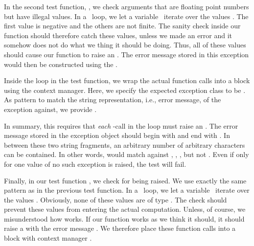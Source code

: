 In the second test function, , we check arguments that are floating point numbers but have illegal values.
In a ~loop, we let a variable~ iterate over the values .
The first value is negative and the others are not finite.
The sanity check  inside our function should therefore catch these values, unless we made an error and it somehow does not do what we thing it should be doing.
Thus, all of these values should cause our  function to raise an .
The error message stored in this exception would then be constructed using the  .

Inside the loop in the test function, we wrap the actual function calls into a  block using the  context manager.
Here, we specify the expected exception class to be .
As pattern to match the string representation, i.e., error message, of the exception against, we provide .
%
\begin{sloppypar}%
In summary, this requires that \emph{each} -call in the loop must raise an .
The error message stored in the exception object should begin with  and end with .
In between these two string fragments, an arbitrary number of arbitrary characters can be contained.
In other words,  would match against , , , but not .
Even if only for one value of  no such exception is raised, the test will fail.%
\end{sloppypar}%
%
\begin{sloppypar}%
Finally, in our test function , we check for  being raised.
We use exactly the same pattern as in the previous test function.
In a ~loop, we let a variable~ iterate over the values .
Obviously, none of these values are of type .
The check  should prevent these values from entering the actual computation.
Unless, of course, we misunderstood how  works.
If our function  works as we think it should, it should raise a  with the error message .
We therefore place these function calls into a  block with context manager .
\end{sloppypar}%
